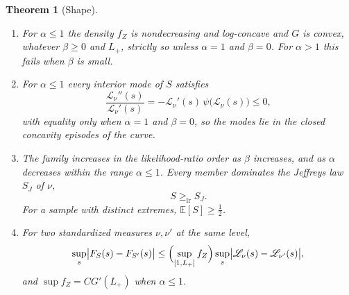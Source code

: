 \documentclass[10pt,a4paper]{amsart}
\newtheorem{theorem}{Theorem}
\providecommand{\E}{\mathbb{E}}
\providecommand{\Leh}{\mathscr{L}}
\providecommand{\lr}{\mathrm{lr}}
\begin{document}
	\begin{theorem}[Shape]\label{thm:shape}\leavevmode
		\begin{enumerate}[label=\textup{(\roman*)},leftmargin=2.2em]
			\item For $\alpha\le1$ the density $f_Z$ is nondecreasing and
			log-concave and $G$ is convex, whatever $\beta\ge0$ and $L_+$,
			strictly so unless $\alpha=1$ and $\beta=0$. For $\alpha>1$ this
			fails when $\beta$ is small.
			\item For $\alpha\le1$ every interior mode of $S$ satisfies
			\begin{equation}\label{eq:modeeq}
				\frac{\Leh_\nu''(s)}{\Leh_\nu'(s)}=-\Leh_\nu'(s)\,\psi\bigl(\Leh_\nu(s)\bigr)\le0 ,
			\end{equation}
			with equality only when $\alpha=1$ and $\beta=0$, so the modes
			lie in the closed concavity episodes of the curve.
			\item The family increases in the likelihood-ratio order as $\beta$
			increases, and as $\alpha$ decreases within the range
			$\alpha\le1$. Every member dominates the Jeffreys law $S_J$ of
			$\nu$,
			\begin{equation}\label{eq:lrjeffreys}
				S\ge_{\lr}S_J .
			\end{equation}
			For a sample with distinct extremes, $\E[S]\ge\tfrac12$.
			\item For two standardized measures $\nu,\nu'$ at the same level,
			\begin{equation}\label{eq:kolmogorov}
				\sup_s\bigl|F_S(s)-F_{S'}(s)\bigr|
				\le\Bigl(\sup_{[1,L_+]}f_Z\Bigr)\sup_s\bigl|\Leh_\nu(s)-\Leh_{\nu'}(s)\bigr| ,
			\end{equation}
			and $\sup f_Z=CG'(L_+)$ when $\alpha\le1$.
		\end{enumerate}
	\end{theorem}
\end{document}
